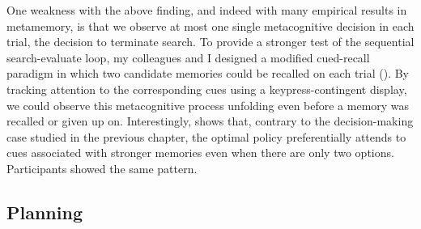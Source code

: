 \documentclass[11pt,a4paperpaper,]{article}
\begin{document}
One weakness with the above finding, and indeed with many empirical results in metamemory, is that we observe at most one single metacognitive decision in each trial, the decision to terminate search. To provide a stronger test of the sequential search-evaluate loop, my colleagues and I designed a modified cued-recall paradigm in which two candidate memories could be recalled on each trial (). By tracking attention to the corresponding cues using a keypress-contingent display, we could observe this metacognitive process unfolding even before a memory was recalled or given up on. Interestingly,  shows that, contrary to the decision-making case studied in the previous chapter, the optimal policy preferentially attends to cues associated with stronger memories even when there are only two options. Participants showed the same pattern.


\subsection{Planning}
\end{document}
